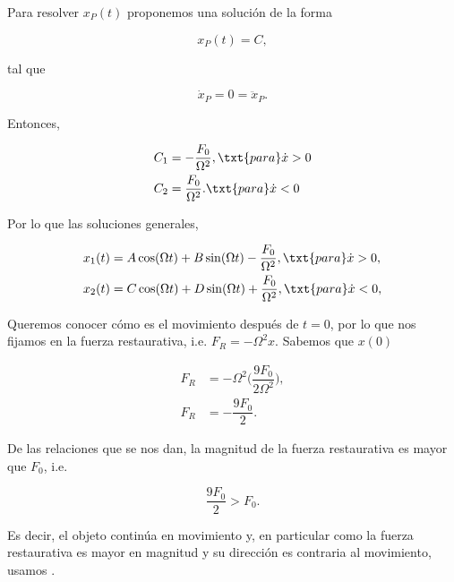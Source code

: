 \documentclass[../main.tex]{subfiles}
\begin{document}
Para resolver \(x_{P}(t)\) proponemos una solución de la forma

\begin{equation*}
	x_{P}(t) = C,
\end{equation*}

tal que

\begin{equation*}
	\dot{x}_{P} = 0 = \ddot{x}_{P}.
\end{equation*}

Entonces,

\begin{align*}
	C_{1} & = -\dfrac{F_{0}}{\Omega^{2}}, \txt{para} \dot{x} > 0 \\
	C_{2} & = \dfrac{F_{0}}{\Omega^{2}}. \txt{para} \dot{x} < 0
\end{align*}

Por lo que las soluciones generales,

\begin{align}
	x_{1}(t) & = A\cos(\Omega t) + B\sin(\Omega t) - \dfrac{F_{0}}{\Omega^{2}}, \txt{para} \dot{x} > 0, \label{eq:sol-greater-coef} \\
	x_{2}(t) & = C\cos(\Omega t) + D\sin(\Omega t) + \dfrac{F_{0}}{\Omega^{2}}, \txt{para} \dot{x} < 0, \label{eq:sol-less-coef}
\end{align}

Queremos conocer cómo es el movimiento después de \(t = 0\), por lo que
nos fijamos en la fuerza restaurativa, i.e. \(F_{R} = -\Omega^{2}x\).
Sabemos que \(x(0)\)

\begin{align*}
	F_{R} & = -\Omega^{2}\biggl(\dfrac{9F_{0}}{2\Omega^{2}}\biggr), \\
	F_{R} & = -\dfrac{9F_{0}}{2}.
\end{align*}

De las relaciones que se nos dan, la magnitud de la fuerza restaurativa
es mayor que \(F_{0}\), i.e.

\begin{equation*}
	\dfrac{9F_{0}}{2} > F_{0}.
\end{equation*}

Es decir, el objeto continúa en movimiento y, en particular como la fuerza
restaurativa es mayor en magnitud y su dirección es contraria al movimiento,
usamos .
\end{document}
